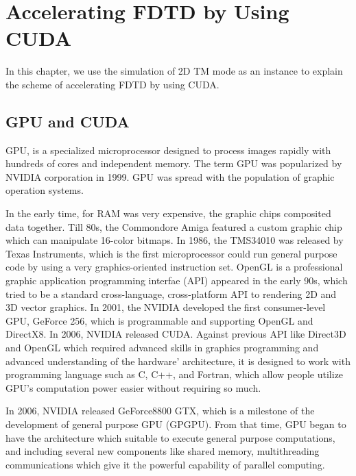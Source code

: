 
\chapter{Accelerating FDTD by Using CUDA}

In this chapter, we use the simulation of 2D TM mode as an instance to explain the scheme of accelerating FDTD by using CUDA.

\section{GPU and CUDA}

GPU, is a specialized microprocessor designed to process images rapidly with hundreds of cores and independent memory. The term GPU was popularized by NVIDIA corporation in 1999. GPU was spread with the population of graphic operation systems.

In the early time, for RAM was very expensive, the graphic chips composited data together. Till 80s, the Commondore Amiga featured a custom graphic chip which can manipulate 16-color bitmaps. In 1986, the TMS34010 was released by Texas Instruments, which is the first microprocessor could run general purpose code by using a very graphics-oriented instruction set. OpenGL is a professional graphic application programming interfae (API) appeared in the early 90s, which tried to be a standard cross-language, cross-platform API to rendering 2D and 3D vector graphics. In 2001, the NVIDIA developed the first consumer-level GPU, GeForce 256, which is programmable and supporting OpenGL and DirectX8. In 2006, NVIDIA released CUDA. Against previous API like Direct3D and OpenGL which required advanced skills in graphics programming and advanced understanding of the hardware' architecture, it is designed to work with programming language such as C, C++, and Fortran, which allow people utilize GPU's computation power easier without requiring so much. 

In 2006, NVIDIA released GeForce8800 GTX, which is a milestone of the development of general purpose GPU (GPGPU). From that time, GPU began to have the architecture which suitable to execute general purpose computations, and including several new components like shared memory, multithreading communications which give it the powerful capability of parallel computing.

